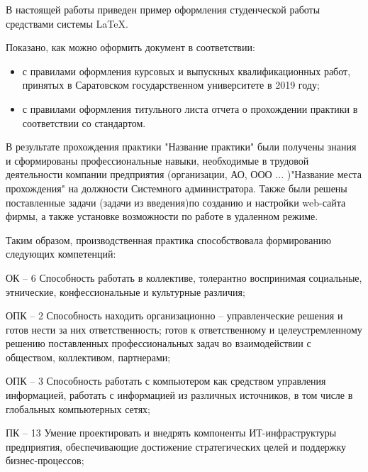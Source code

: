 \documentclass[bachelor, och, coursework]{SCWorks}
\begin{document}
\conclusion
В настоящей работы приведен пример оформления студенческой работы средствами системы \LaTeX.

Показано, как можно оформить документ в соответствии:
\begin{itemize}
    \item с правилами оформления курсовых и выпускных квалификационных работ, принятых в Саратовском государственном университете в 2019 году;
    \item с правилами оформления титульного листа отчета о прохождении практики в соответствии со стандартом.
\end{itemize}


В результате прохождения практики "Название практики"  были получены знания и сформированы профессиональные навыки, необходимые в трудовой деятельности компании предприятия (организации, АО, ООО ... )"Название места прохождения" на
должности Системного администратора. Также были решены поставленные задачи (задачи из введения)по созданию и настройки web-сайта фирмы, а также установке
возможности по работе в удаленном режиме.

Таким образом, производственная практика способствовала формированию следующих компетенций:%

ОК – 6 Способность работать в коллективе, толерантно воспринимая социальные, этнические, конфессиональные и культурные различия;

ОПК – 2 Способность находить организационно – управленческие решения и готов нести за них ответственность; готов к ответственному и целеустремленному решению поставленных профессиональных задач во взаимодействии с обществом, коллективом, партнерами;

ОПК – 3 Способность работать с компьютером как средством управления информацией, работать с информацией из различных источников, в том числе в глобальных компьютерных сетях;

ПК – 13 Умение проектировать и внедрять компоненты ИТ-инфраструктуры предприятия, обеспечивающие достижение стратегических целей и поддержку бизнес-процессов;
\end{document}
